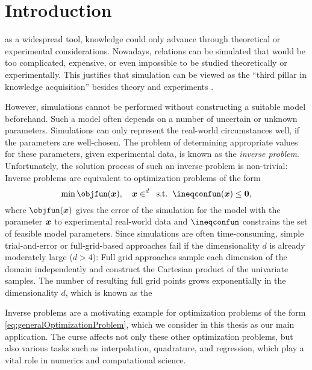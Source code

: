 
\chapter{Introduction}
\label{chap:10introduction}

as a widespread tool,
knowledge could only advance through theoretical or
experimental considerations.
Nowadays, relations can be simulated
that would be too complicated, expensive, or even impossible
to be studied theoretically or experimentally.
This justifies that simulation can be viewed as the
``third pillar in knowledge acquisition''
besides theory and experiments \cite{Bungartz14Modeling}.

However, simulations cannot be performed without constructing
a suitable model beforehand.
Such a model often depends on a number of uncertain or unknown parameters.
Simulations can only represent the real-world circumstances well,
if the parameters are well-chosen.
The problem of determining appropriate values for these parameters,
given experimental data, is known as the \emph{inverse problem}.
Unfortunately, the solution process of such an inverse problem is non-trivial:
Inverse problems are equivalent to optimization problems of the form
\begin{equation}
  \label{eq:generalOptimizationProblem}
  \min \objfun(\*x),\quad
  \*x \in \real^d\;\;\text{s.t.}\;\;
  \ineqconfun(\*x) \le \*0,
\end{equation}
where $\objfun(\*x)$ gives the error of the simulation for the model with
the parameter ${\boldsymbol{x}}$ to experimental real-world data and
$\ineqconfun$ constrains the set of feasible model parameters.
Since simulations are often time-consuming,
simple trial-and-error or full-grid-based approaches fail
if the dimensionality $d$ is already moderately large ($d > 4$):
Full grid approaches sample each dimension of the domain
independently and construct the Cartesian product of the univariate
samples.
The number of resulting full grid points
grows exponentially in the dimensionality $d$,
which is known as the 

Inverse problems are a motivating example for optimization problems
of the form \eqref{eq:generalOptimizationProblem}, which we consider in
this thesis as our main application.
The curse affects not only these other optimization problems,
but also various tasks such as interpolation, quadrature, and regression,
which play a vital role in numerics and computational science.

